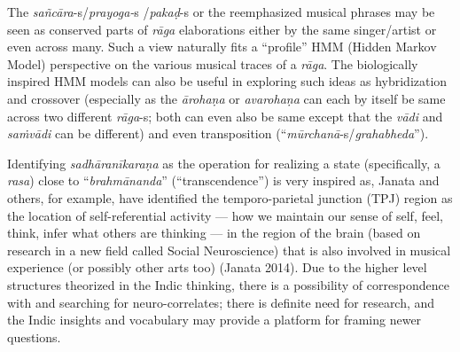 The \textsl{sañcāra}-s/\textsl{prayoga-}s
/\textsl{pakaḍ}-s or the reemphasized musical phrases may be seen as conserved parts of \textsl{rāga} elaborations either by the same singer/artist or even across many. Such a view naturally fits a “profile” HMM (Hidden Markov Model) perspective on the various musical traces of a \textsl{rāga}. The biologically inspired HMM models can also be useful in exploring such ideas as hybridization and crossover (especially as the \textsl{ārohaṇa} or \textsl{avarohaṇa} can each by itself be same across two different \textsl{rāga}-s; both can even also be same except that the \textsl{vādi} and \textsl{saṁvādi} can be different) and even transposition (“\textsl{mūrchanā}-s/\textsl{grahabheda}”).

Identifying \textsl{sadhāranīkaraṇa} as the operation for realizing a state (specifically, a \textsl{rasa}) close to “\textsl{brahmānanda}” (“transcendence”) is very inspired as, Janata and others, for example, have identified the temporo-parietal junction (TPJ) region as the location of self-referential activity — how we maintain our sense of self, feel, think, infer what others are thinking --- in the region of the brain (based on research in a new field called Social Neuroscience) that is also involved in musical experience (or possibly other arts too) (Janata 2014). Due to the higher level structures theorized in the Indic thinking, there is a possibility of correspondence with and searching for neuro-correlates; there is definite need for research, and the Indic insights and vocabulary may provide a platform for framing newer questions.

